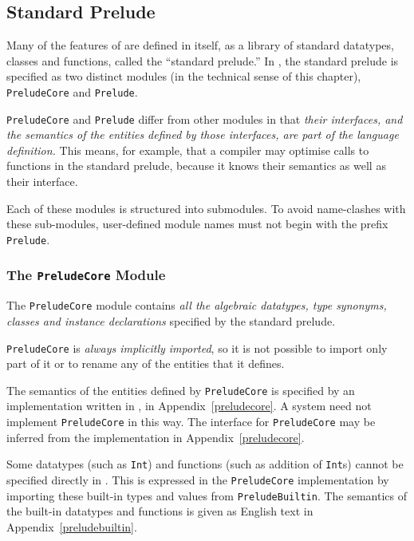 \subsection{Standard Prelude}
\label{standard-prelude}

Many of the features of \Haskell{} are defined in \Haskell{}
itself, as a library of standard datatypes, classes and
functions, called the ``standard prelude.''  In
\Haskell{}, the standard prelude is specified as two distinct modules
(in the technical sense of this chapter), \mbox{\tt PreludeCore} and
\mbox{\tt Prelude}.

\mbox{\tt PreludeCore} and \mbox{\tt Prelude} differ from other modules in that
{\em their interfaces,
and the semantics of the entities defined by those interfaces, are
part of the \Haskell{} language definition.} This means, for example, that a
compiler may optimise calls to functions in the
standard prelude, because it knows their semantics as well as their
interface.

Each of these modules is structured into submodules.
To avoid name-clashes with these sub-modules,
user-defined module names must not begin with the prefix \mbox{\tt Prelude}.

\subsubsection{The \mbox{\tt PreludeCore} Module}

The \mbox{\tt PreludeCore} module contains {\em all the algebraic datatypes,
type synonyms, classes and instance declarations} specified by the
standard prelude.

\mbox{\tt PreludeCore} is {\em always implicitly imported}, so it
is not possible to import only part of it or to rename any of the
entities that it defines.

The semantics of the entities defined by \mbox{\tt PreludeCore} is specified by
an implementation written in \Haskell{}, in
Appendix~\ref{preludecore}.
A \Haskell{} system need not implement \mbox{\tt PreludeCore} in this way.
The interface for \mbox{\tt PreludeCore} may
be inferred from the implementation in
Appendix~\ref{preludecore}.

Some datatypes (such as \mbox{\tt Int}) and functions (such as addition of
\mbox{\tt Int}s) cannot be specified directly in \Haskell{}.  This is
expressed in the \mbox{\tt PreludeCore} implementation by importing these
built-in types and values from
\mbox{\tt PreludeBuiltin}.
The semantics of the built-in datatypes and
functions is given as English text in
Appendix~\ref{preludebuiltin}.

